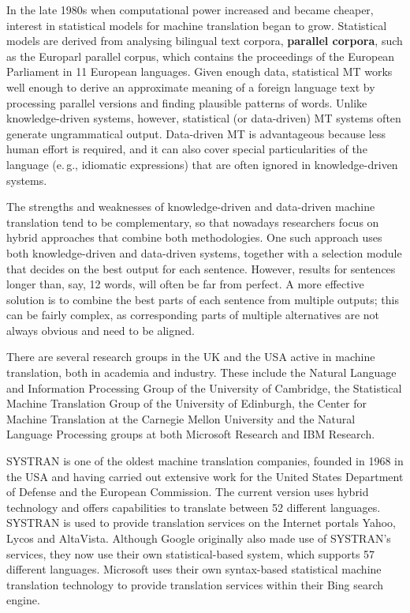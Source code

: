 \documentclass[]{../../metanetpaper}
\begin{document}
\begin{multicols}{2}
In the late 1980s when computational power increased and became cheaper, interest in statistical models for machine translation began to grow. Statistical models are derived from analysing bilingual text corpora, \textbf{parallel corpora}, such as the Europarl parallel corpus, which contains the proceedings of the European Parliament in 11 European languages. Given enough data, statistical MT works well enough to derive an approximate meaning of a foreign language text by processing parallel versions and finding plausible patterns of words. Unlike knowledge-driven systems, however, statistical (or data-driven) MT systems often generate ungrammatical output. Data-driven MT is advantageous because less human effort is required, and it can also cover special particularities of the language (e.\,g., idiomatic expressions) that are often ignored in knowledge-driven systems. 

The strengths and weaknesses of knowledge-driven and data-driven machine translation tend to be complementary, so that nowadays researchers focus on hybrid approaches that combine both methodologies. One such approach uses both knowledge-driven and data-driven systems, together with a selection module that decides on the best output for each sentence. However, results for sentences longer than, say, 12 words, will often be far from perfect. A more effective solution is to combine the best parts of each sentence from multiple outputs; this can be fairly complex, as corresponding parts of multiple alternatives are not always obvious and need to be aligned. 

There are several research groups in the UK and the USA active in machine translation, both in academia and industry. These include the Natural Language and Information Processing Group of the University of Cambridge, the Statistical Machine Translation Group of the University of Edinburgh, the Center for Machine Translation at the Carnegie Mellon University and the Natural Language Processing groups at both Microsoft Research and IBM Research. 

SYSTRAN is one of the oldest machine translation companies, founded in 1968 in the USA and having carried out extensive work for the United States Department of Defense and the European Commission. The current version uses hybrid technology and offers capabilities to translate between 52 different languages. SYSTRAN is used to provide translation services on the Internet portals Yahoo, Lycos and AltaVista. Although Google originally also made use of SYSTRAN's services, they now use their own statistical-based system, which supports 57 different languages. Microsoft uses their own syntax-based statistical machine translation technology to provide translation services within their Bing search engine. 


\end{multicols}
\end{document}
